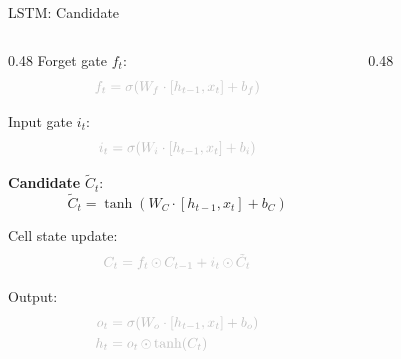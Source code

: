 \begin{frame}{LSTM: Candidate}
  \begin{columns}[T]
    \begin{column}{0.48\textwidth}
      \textcolor{gray!50}{Forget gate $f_t$:}
      \[
        \textcolor{gray!50}{f_t = \sigma\!\left(W_f \cdot [h_{t-1}, x_t] + b_f\right)}
      \]

      \textcolor{gray!50}{Input gate $i_t$:}
      \[
        \textcolor{gray!50}{i_t = \sigma\!\left(W_i \cdot [h_{t-1}, x_t] + b_i\right)}
      \]

      \textbf{Candidate} $\tilde{C}_t$:
      \[
        \tilde{C}_t = \tanh\!\left(W_C \cdot [h_{t-1}, x_t] + b_C\right)
      \]

      \textcolor{gray!50}{Cell state update:}
      \[
        \textcolor{gray!50}{C_t = f_t \odot C_{t-1} + i_t \odot \tilde{C}_t}
      \]

      \textcolor{gray!50}{Output:}
      \[
      \textcolor{gray!50}{
      \begin{aligned}
        o_t &= \sigma\!\left(W_o \cdot [h_{t-1}, x_t] + b_o\right) \\
        h_t &= o_t \odot \tanh(C_t)
      \end{aligned}
      }
      \]
    \end{column}
    \begin{column}{0.48\textwidth}
      \begin{center}
      \end{center}
    \end{column}
  \end{columns}
\end{frame}

